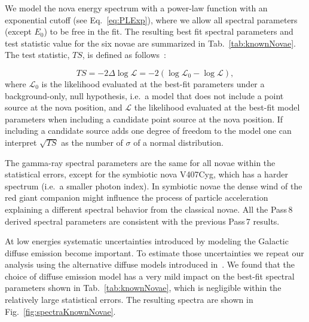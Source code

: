 \documentclass{aa} %
\begin{document}
We model the nova energy spectrum with a power-law function with an exponential cutoff (see Eq.~\ref{eq:PLExp}), where we allow all spectral parameters (except $E_0$) to be free in the fit. The resulting best fit spectral parameters and test statistic value for the six novae are summarized in Tab.~\ref{tab:knownNovae}. The test statistic, $TS$, is defined as follows~\citep{1996ApJ...461..396M}:

\begin{equation}
TS=-2\Delta \log{\mathcal{L}} = -2 (\log{\mathcal{L}_0} - \log{\mathcal{L}} ),
\label{eq:TS}
\end{equation}
where $\mathcal{L}_0$ is the likelihood evaluated at the best-fit parameters under a background-only, null hypothesis, i.e.~a model that does not include a point source at the nova position, and $\mathcal{L}$ the likelihood evaluated at the best-fit model parameters when including a candidate point source at the nova position. If including a candidate source adds one degree of freedom to the model one can interpret $\sqrt{TS}$ as the number of $\sigma$ of a normal distribution.

The gamma-ray spectral parameters are the same for all novae within the statistical errors, except for the symbiotic nova V407Cyg, which has a harder spectrum (i.e.\ a smaller photon index). In symbiotic novae the dense wind of the red giant companion might influence the process of particle acceleration explaining a different spectral behavior from the classical novae. All the Pass\,8 derived spectral parameters are consistent with the previous Pass\,7 results.

At low energies systematic uncertainties introduced by modeling the Galactic diffuse emission become important. To estimate those uncertainties we repeat our analysis using the alternative diffuse models introduced in~\citet{2015arXiv150703633B}. We found that the choice of diffuse emission model has a very mild impact on the best-fit spectral parameters shown in Tab.~\ref{tab:knownNovae}, which is negligible within the relatively large statistical errors. The resulting spectra are shown in Fig.~\ref{fig:spectraKnownNovae}.
\end{document}
